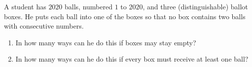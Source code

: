A student has $2020$ balls, numbered $1$ to $2020$, and three (distinguishable) ballot boxes. He puts each ball into one of the boxes so that no box contains two balls with consecutive numbers.
\begin{enumerate}
\item[(a)] In how many ways can he do this if boxes may stay empty?
\item[(b)] In how many ways can he do this if every box must receive at least one ball?
\end{enumerate}
